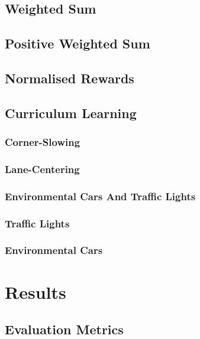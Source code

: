 \documentclass{article}
\begin{document}
\subsection{Weighted Sum}
\lipsum[2][1]

\subsection{Positive Weighted Sum}
\lipsum[2][1]

\subsection{Normalised Rewards}
\lipsum[2][1]

\subsection{Curriculum Learning}
\lipsum[2][1]

\subsubsection{Corner-Slowing}
\lipsum[2][1]

\subsubsection{Lane-Centering}
\lipsum[2][1]

\subsubsection{Environmental Cars And Traffic Lights}
\lipsum[2][1]

\subsubsection{Traffic Lights}
\lipsum[2][1]

\subsubsection{Environmental Cars}
\lipsum[2][1]


\section{Results}
\lipsum[2][1]

\subsection{Evaluation Metrics}
\lipsum[2][1]
\end{document}

